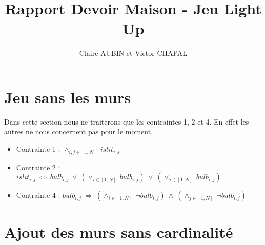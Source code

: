 \documentclass{article}
\begin{document}
\title{Rapport Devoir Maison - Jeu Light Up}
\author{Claire AUBIN et Victor CHAPAL}
\maketitle

\section{Jeu sans les murs}
Dans cette section nous ne traiterons que les contraintes 1, 2 et 4. En effet les autres ne nous concernent pas pour le moment.

\begin{itemize}
\item Contrainte 1 : $ \wedge_{i,j \in [1,N]} ~ islit_{i,j}  $
\item Contrainte 2 : $ islit_{i,j} ~ \Leftrightarrow ~ bulb_{i,j} ~ \vee ~ (\vee_{i \in [1,N]} ~ bulb_{i,j}) ~ \vee ~ (\vee_{j \in [1,N]} ~ bulb_{i,j}) $
\item Contrainte 4 : $ bulb_{i,j} ~ \Rightarrow ~ (\wedge_{i \in [1,N]} ~ \neg bulb_{i,j}) ~ \wedge ~ (\wedge_{j \in [1,N]} ~ \neg bulb_{i,j})  $
\end{itemize}

\section{Ajout des murs sans cardinalit\'e}
\end{document}
